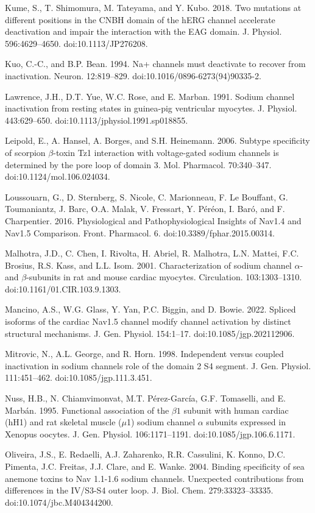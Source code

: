 \begin{hangparas}{.25in}{1}
Kume, S., T. Shimomura, M. Tateyama, and Y. Kubo. 2018. Two mutations at different positions in the CNBH domain of the hERG channel accelerate deactivation and impair the interaction with the EAG domain. J. Physiol. 596:4629–4650. doi:10.1113/JP276208.

Kuo, C.-C., and B.P. Bean. 1994. Na+ channels must deactivate to recover from inactivation. Neuron. 12:819–829. doi:10.1016/0896-6273(94)90335-2.

Lawrence, J.H., D.T. Yue, W.C. Rose, and E. Marban. 1991. Sodium channel inactivation from resting states in guinea-pig ventricular myocytes. J. Physiol. 443:629–650. doi:10.1113/jphysiol.1991.sp018855.

Leipold, E., A. Hansel, A. Borges, and S.H. Heinemann. 2006. Subtype specificity of scorpion $\beta$-toxin Tz1 interaction with voltage-gated sodium channels is determined by the pore loop of domain 3. Mol. Pharmacol. 70:340–347. doi:10.1124/mol.106.024034.

Loussouarn, G., D. Sternberg, S. Nicole, C. Marionneau, F. Le Bouffant, G. Toumaniantz, J. Barc, O.A. Malak, V. Fressart, Y. Péréon, I. Baró, and F. Charpentier. 2016. Physiological and Pathophysiological Insights of Nav1.4 and Nav1.5 Comparison. Front. Pharmacol. 6. doi:10.3389/fphar.2015.00314.

Malhotra, J.D., C. Chen, I. Rivolta, H. Abriel, R. Malhotra, L.N. Mattei, F.C. Brosius, R.S. Kass, and L.L. Isom. 2001. Characterization of sodium channel $\alpha$- and $\beta$-subunits in rat and mouse cardiac myocytes. Circulation. 103:1303–1310. doi:10.1161/01.CIR.103.9.1303.

Mancino, A.S., W.G. Glass, Y. Yan, P.C. Biggin, and D. Bowie. 2022. Spliced isoforms of the cardiac Nav1.5 channel modify channel activation by distinct structural mechanisms. J. Gen. Physiol. 154:1–17. doi:10.1085/jgp.202112906.

Mitrovic, N., A.L. George, and R. Horn. 1998. Independent versus coupled inactivation in sodium channels role of the domain 2 S4 segment. J. Gen. Physiol. 111:451–462. doi:10.1085/jgp.111.3.451.

Nuss, H.B., N. Chiamvimonvat, M.T. Pérez-García, G.F. Tomaselli, and E. Marbán. 1995. Functional association of the $\beta1$ subunit with human cardiac (hH1) and rat skeletal muscle ($\mu$1) sodium channel $\alpha$ subunits expressed in Xenopus oocytes. J. Gen. Physiol. 106:1171–1191. doi:10.1085/jgp.106.6.1171.

Oliveira, J.S., E. Redaelli, A.J. Zaharenko, R.R. Cassulini, K. Konno, D.C. Pimenta, J.C. Freitas, J.J. Clare, and E. Wanke. 2004. Binding specificity of sea anemone toxins to Nav 1.1-1.6 sodium channels. Unexpected contributions from differences in the IV/S3-S4 outer loop. J. Biol. Chem. 279:33323–33335. doi:10.1074/jbc.M404344200.


\end{hangparas}
